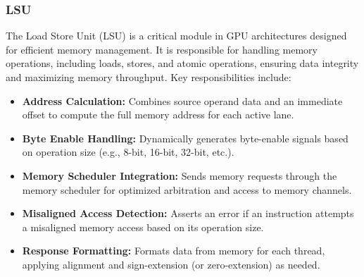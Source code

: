 \documentclass[12pt]{report}
\begin{document}
\subsubsection{LSU}
The Load Store Unit (LSU)  is a critical module in GPU architectures designed for efficient memory management. It is responsible for handling memory operations, including loads, stores, and atomic operations, ensuring data integrity and maximizing memory throughput. Key responsibilities include:
\begin{itemize}
    \item \textbf{Address Calculation:} 
    Combines source operand data and an immediate offset to compute the full memory address for each active lane.
    
    \item \textbf{Byte Enable Handling:} 
    Dynamically generates byte-enable signals based on operation size (e.g., 8-bit, 16-bit, 32-bit, etc.).
    
    \item \textbf{Memory Scheduler Integration:} 
    Sends memory requests through the memory scheduler for optimized arbitration and access to memory channels.

    \item \textbf{Misaligned Access Detection:} 
    Asserts an error if an instruction attempts a misaligned memory access based on its operation size.
    
    \item \textbf{Response Formatting:} 
    Formats data from memory for each thread, applying alignment and sign-extension (or zero-extension) as needed.
\end{itemize}
\end{document}
